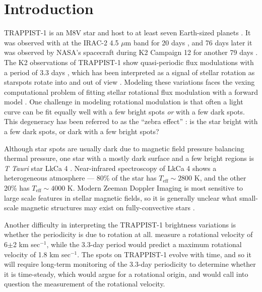 

\section{Introduction}

TRAPPIST-1 is an M8V star and host to at least seven Earth-sized planets \citep{Gillon2016,Gillon2017}. It was observed with \spitzer at the IRAC-2 4.5 $\mu$m band for 20 days \citep{Gillon2017,Delrez2018}, and 76 days later it was observed by NASA's \kepler spacecraft during K2 Campaign 12 for another 79 days \citep{luger2017everest}.  The K2 observations of TRAPPIST-1 show quasi-periodic flux modulations with a period of 3.3 days \citep{Luger2017, Delrez2018}, which has been interpreted as a signal of stellar rotation as starspots rotate into and out of view \citep{Vida2017}.  Modeling these variations faces the vexing computational problem of fitting stellar rotational flux modulation with a forward model \citep{Aigrain2015, Davenport2015}. One challenge in modeling rotational modulation is that often a light curve can be fit equally well with a few bright spots \textit{or} with a few dark spots. This degeneracy has been referred to as the ``zebra effect''  \citep{Pettersen1992}: is the star bright with a few dark spots, or dark with a few bright spots?

Although star spots are usually dark due to magnetic field pressure balancing thermal pressure, one star with a mostly dark surface and a few bright regions is \textit{T Tauri} star LkCa 4 \citep{Gully2017}. Near-infrared spectroscopy of LkCa 4 shows a heterogeneous atmosphere --- 80\%  of the star has $T_{\mathrm{eff}} \sim 2800$ K, and the other 20\% has $T_{\mathrm{eff}} \sim 4000$ K. Modern Zeeman Doppler Imaging is most sensitive to large scale features in stellar magnetic fields, so it is generally unclear what small-scale magnetic structures may exist on fully-convective stars \citep[see e.g.~][]{Morin2013}.

Another difficulty in interpreting the TRAPPIST-1 brightness variations is whether the periodicity is due to rotation at all.  \cite{Reiners2010} measure a rotational velocity of 6$\pm$2 km sec$^{-1}$, while the 3.3-day period would predict a maximum rotational velocity of 1.8 km sec$^{-1}$.  The spots on TRAPPIST-1 evolve with time, and so it will require long-term monitoring of the 3.3-day periodicity to determine whether it is time-steady, which would argue for a rotational origin, and would call into question the measurement of the rotational velocity.

